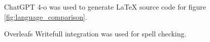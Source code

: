 

ChatGPT 4-o was used to generate LaTeX source code for figure \ref{fig:language_comparison}.

Overleafs Writefull integration was used for spell checking.